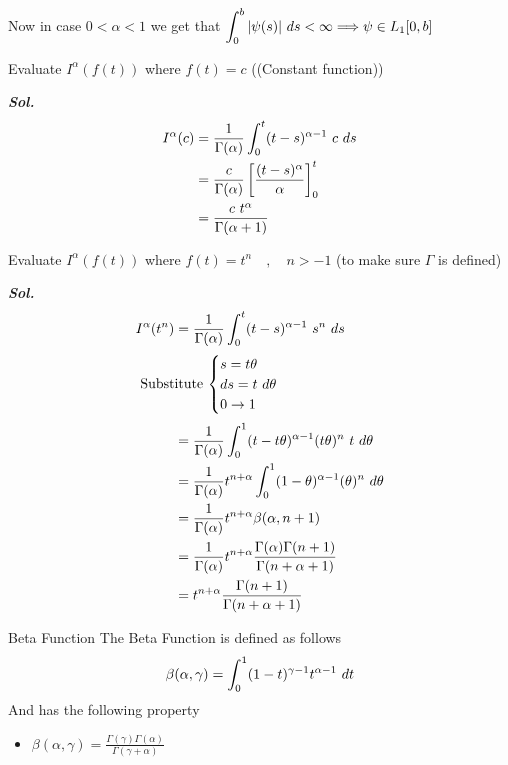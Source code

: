 Now in case $ 0 < \alpha < 1$ we get that $\displaystyle \int_{0}^{b} |\psi(s)| \,\, ds < \infty \Longrightarrow \psi \in L_1[0, b]$
\begin{example}
    Evaluate $I^{\alpha}(f(t))$ where $f(t) = c$ ((Constant function))
    
    \textit{ \textbf{Sol.} }
    \begin{align*}
        I^{\alpha} (c) &= \frac{1}{\Gamma(\alpha)}\int_{0}^{t} (t-s)^{\alpha-1} \,\, c \,\, ds     
         \\
         &= \frac{c}{\Gamma(\alpha)} \left[ \frac{(t-s)^{\alpha}}{\alpha}\right]_{0}^{t}
         \\
         &= \frac{c \,\, t^\alpha }{\Gamma(\alpha+1)}
    \end{align*}
\end{example}
\begin{example}
    Evaluate $I^{\alpha}(f(t))$ where $f(t) = t^{n} \quad,\quad n>-1$ (to make sure $\Gamma$ is defined)
    
    \textit{ \textbf{Sol.} }
    \begin{align*}
        I^{\alpha}(t^{n}) &= \frac{1}{\Gamma{(\alpha)}} \int_0^t (t-s)^{\alpha-1} \,\, s^n \,\, ds
        \\
    \intertext{
            Substitute
    \(
    \begin{cases}
        \displaystyle s = t\theta
        \\
        \displaystyle ds = t \,\,d\theta
        \\
        \displaystyle 0 \to 1
    \end{cases}
    \)
        }
                          & = \frac{1}{\Gamma{(\alpha)}} \int_0^1 (t-t\theta)^{\alpha-1} (t\theta)^n \,\, t \,\, d\theta 
                          \\
                          & = \frac{1}{\Gamma{(\alpha)}} t^{n+\alpha} \int_0^1 (1-\theta)^{\alpha-1} (\theta)^n \,\, d\theta             
                          \\
                          & = \frac{1}{\Gamma{(\alpha)}} t^{n+\alpha} \beta{(\alpha,n+1)}
                          \\
                          & = \frac{1}{\Gamma{(\alpha)}} t^{n+\alpha}\frac{\Gamma{(\alpha)}\Gamma{(n+1)} }{\Gamma{(n+\alpha+1)} } 
                          \\
                          & =  t^{n+\alpha}\frac{\Gamma{(n+1)} } {\Gamma{(n+\alpha+1)} }
    \end{align*}
\end{example}
\begin{enrichment*}{Beta Function}
    The Beta Function is defined as follows
    \[
    \beta(\alpha,\gamma) = \int_{0}^{1} (1-t)^{\gamma-1}t^{\alpha-1} \,\, dt
    \]  
    And has the following property
    \begin{itemize}
        \item $\displaystyle \beta(\alpha,\gamma) = \frac{\Gamma{(\gamma)}\Gamma{(\alpha)} }{\Gamma{(\gamma + \alpha)} } $
    \end{itemize}
\end{enrichment*}

